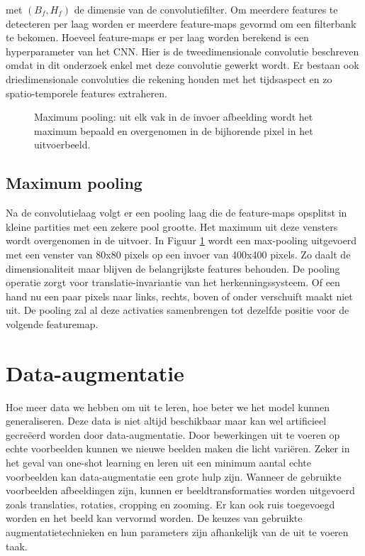 \npar met $(B_f, H_f)$ de dimensie van de convolutiefilter. Om meerdere features te detecteren per laag worden er meerdere feature-maps gevormd om een filterbank te bekomen. Hoeveel feature-maps er per laag worden berekend is een hyperparameter van het CNN.
\npar Hier is de tweedimensionale convolutie beschreven omdat in dit onderzoek enkel met deze convolutie gewerkt wordt. Er bestaan ook driedimensionale convoluties die rekening houden met het tijdsaspect en zo spatio-temporele features extraheren.

\begin{figure}[t!]
	\centering
	
	\caption{Maximum pooling: uit elk vak in de invoer afbeelding wordt het maximum bepaald en overgenomen in de bijhorende pixel in het uitvoerbeeld.}
	\label{fig:max-pooling}
\end{figure}\textsl{\textsl{}}
\subsection{Maximum pooling}


Na de convolutielaag volgt er een pooling laag die de feature-maps opsplitst in kleine partities met een zekere pool grootte. Het maximum uit deze vensters wordt overgenomen in de uitvoer. In Figuur \ref{fig:max-pooling} wordt een max-pooling uitgevoerd met een venster van 80x80 pixels op een invoer van 400x400 pixels. Zo daalt de dimensionaliteit maar blijven de belangrijkste features behouden.
\npar De pooling operatie zorgt voor translatie-invariantie van het herkenningssysteem. Of een hand nu een paar pixels naar links, rechts, boven of onder verschuift maakt niet uit. De pooling zal al deze activaties samenbrengen tot dezelfde positie voor de volgende featuremap. 

\section{Data-augmentatie}\label{sec:data-augm}
Hoe meer data we hebben om uit te leren, hoe beter we het model kunnen generaliseren. Deze data is niet altijd beschikbaar maar kan wel artificieel gecre\"eerd worden door data-augmentatie. Door bewerkingen uit te voeren op echte voorbeelden kunnen we nieuwe beelden maken die licht vari\"eren.
\npar Zeker in het geval van one-shot learning en leren uit een minimum aantal echte voorbeelden kan data-augmentatie een grote hulp zijn. Wanneer de gebruikte voorbeelden afbeeldingen zijn, kunnen er beeldtransformaties worden uitgevoerd zoals translaties, rotaties, cropping en zooming. Er kan ook ruis toegevoegd worden en het beeld kan vervormd worden. De keuzes van gebruikte augmentatietechnieken en hun parameters zijn afhankelijk van de uit te voeren taak. 
